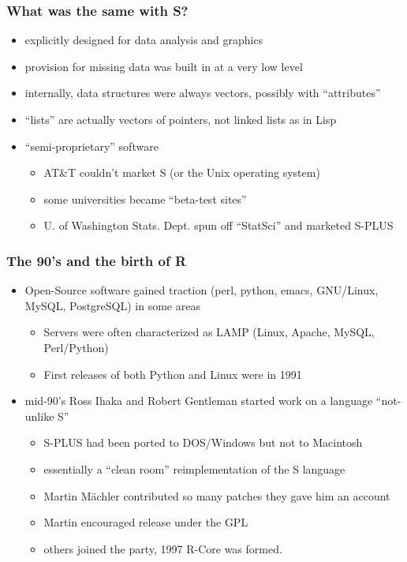 \documentclass[pdf]{beamer}
\begin{document}
  \begin{frame}\frametitle{What was the same with S?}
    \begin{itemize}
      \pause
      \item explicitly designed for data analysis and graphics
      \pause
      \item provision for missing data was built in at a very low level
      \pause
      \item
      internally, data structures were always vectors, possibly with ``attributes''
      \pause
      \item ``lists'' are actually vectors of pointers, not linked lists as in
      Lisp
      \pause
      \item ``semi-proprietary'' software
      \begin{itemize}
        \pause
        \item AT\&T couldn't market S (or the Unix operating system)
        \item some universities became ``beta-test sites''
        \item U. of Washington Stats. Dept. spun off ``StatSci'' and marketed S-PLUS
      \end{itemize}
    \end{itemize}
  \end{frame}

  \begin{frame}\frametitle{The 90's and the birth of R}
        \begin{itemize}
    \pause
    \item
      Open-Source software gained traction (perl, python, emacs, GNU/Linux, MySQL,
      PostgreSQL) in some areas
      \begin{itemize}
      \pause
      \item Servers were often characterized as LAMP (Linux, Apache, MySQL,
        Perl/Python)
      \item First releases of both Python and Linux were in 1991
      \end{itemize}
    \pause
    \item
      mid-90's Ross Ihaka and Robert Gentleman started work on a language
      ``not-unlike S''
      \begin{itemize}
        \pause
        \item S-PLUS had been ported to DOS/Windows but not to Macintosh
        \item essentially a ``clean room'' reimplementation of the S language
        \item Martin M\"{a}chler contributed so many patches they gave him an account
        \item Martin encouraged release under the GPL
        \item others joined the party, 1997 R-Core was formed.
      \end{itemize}
    \end{itemize}
  \end{frame}
\end{document}

